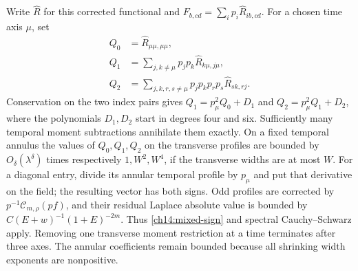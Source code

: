 Write $\widehat R$ for this corrected functional and
$F_{b,cd}=\sum_i p_i\widehat R_{ib,cd}$. For a chosen time axis
$\mu$, set
\begin{align*}
 Q_0&=\widehat R_{\mu\mu,\mu\mu},\\
 Q_1&=\sum_{j,k\ne\mu}p_jp_k\widehat R_{k\mu,j\mu},\\
 Q_2&=\sum_{j,k,r,s\ne\mu}p_jp_kp_rp_s\widehat R_{sk,rj}.
\end{align*}
Conservation on the two index pairs gives
$Q_1=p_\mu^2Q_0+D_1$ and $Q_2=p_\mu^2Q_1+D_2$, where the
polynomials $D_1,D_2$ start in degrees four and six. Sufficiently
many temporal moment subtractions annihilate them exactly.
On a fixed temporal annulus the values of $Q_0,Q_1,Q_2$ on the transverse profiles
are bounded by $O_\delta(\lambda^\delta)$ times respectively
$1,W^2,W^4$, if the transverse widths are at most $W$. For a diagonal
entry, divide its annular temporal profile by $p_\mu$ and put that
derivative on the field; the resulting vector has both signs.
Odd profiles are corrected by
$p^{-1}\mathcal C_{m,\rho}(pf)$, and their residual Laplace absolute
value is bounded by $C(E+w)^{-1}(1+E)^{-2m}$.
Thus \eqref{ch14:mixed-sign} and spectral Cauchy--Schwarz apply.
Removing one transverse moment restriction at a time terminates
after three axes. The annular coefficients remain bounded because
all shrinking width exponents are nonpositive.

